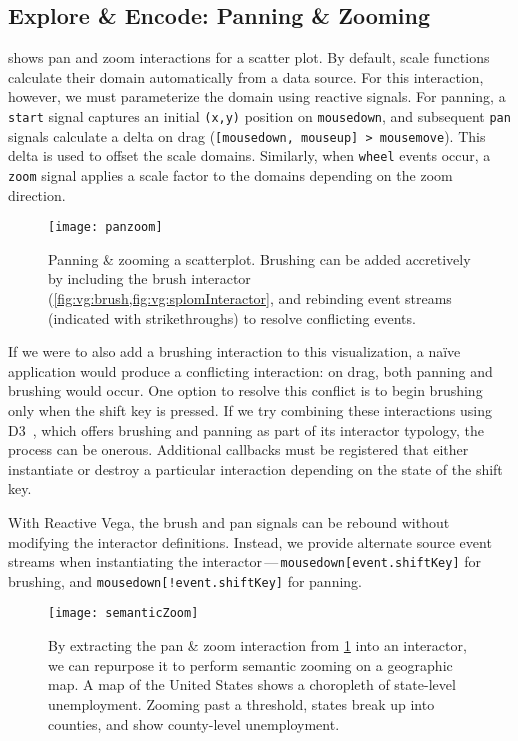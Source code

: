 \subsection{Explore \& Encode: Panning \& Zooming}

 shows pan and zoom interactions for a scatter plot. By
default, scale functions calculate their domain automatically from a data
source. For this interaction, however, we must parameterize the domain using
reactive signals. For panning, a \texttt{start} signal captures an initial
\texttt{(x,y)} position on \texttt{mousedown}, and subsequent \texttt{pan}
signals calculate a delta on drag (\texttt{[mousedown, mouseup] > mousemove}).
This delta is used to offset the scale domains. Similarly, when \texttt{wheel}
events occur, a \texttt{zoom} signal applies a scale factor to the domains
depending on the zoom direction.

\begin{figure}[h!]
  \centering
  \texttt{[image: panzoom]}
  \caption{Panning \& zooming a scatterplot. Brushing can be added accretively
  by including the brush interactor (\cref{fig:vg:brush,fig:vg:splomInteractor},
  and rebinding event streams (indicated with strikethroughs) to resolve
  conflicting events.}
  \label{fig:vg:panzoom}
\end{figure}

If we were to also add a brushing interaction to this visualization, a na\"ive
application would produce a conflicting interaction: on drag, both panning and
brushing would occur. One option to resolve this conflict is to begin brushing
only when the shift key is pressed. If we try combining these interactions using
D3~\cite{bostock:d3}, which offers brushing and panning as part of its
interactor typology, the process can be onerous. Additional callbacks must be
registered that either instantiate or destroy a particular interaction depending
on the state of the shift key.

With Reactive Vega, the brush and pan signals can be rebound without modifying
the interactor definitions. Instead, we provide alternate source event streams
when instantiating the interactor\,---\,\texttt{mousedown[event.shiftKey]} for
brushing, and \texttt{mousedown[!event.shiftKey]} for panning.

\begin{figure}[h!]
  \centering
  \texttt{[image: semanticZoom]}
  \caption{By extracting the pan \& zoom interaction from \cref{fig:vg:panzoom}
  into an interactor, we can repurpose it to perform semantic zooming on a
  geographic map. A map of the United States shows a choropleth of state-level
  unemployment. Zooming past a threshold, states break up into counties, and
  show county-level unemployment.}
  \label{fig:vg:semanticZoom}
\end{figure}

